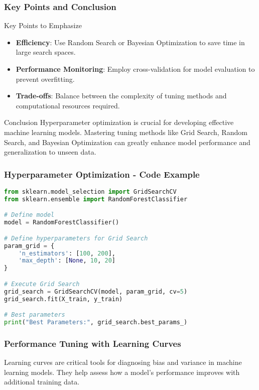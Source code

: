 \documentclass[aspectratio=169]{beamer}
\begin{document}
\begin{frame}[fragile]
    \frametitle{Key Points and Conclusion}
    \begin{block}{Key Points to Emphasize}
        \begin{itemize}
            \item \textbf{Efficiency}: Use Random Search or Bayesian Optimization to save time in large search spaces.
            \item \textbf{Performance Monitoring}: Employ cross-validation for model evaluation to prevent overfitting.
            \item \textbf{Trade-offs}: Balance between the complexity of tuning methods and computational resources required.
        \end{itemize}
    \end{block}

    \begin{block}{Conclusion}
        Hyperparameter optimization is crucial for developing effective machine learning models. Mastering tuning methods like Grid Search, Random Search, and Bayesian Optimization can greatly enhance model performance and generalization to unseen data.
    \end{block}
\end{frame}

\begin{frame}[fragile]
    \frametitle{Hyperparameter Optimization - Code Example}
    \begin{lstlisting}[language=Python, frame=single]
from sklearn.model_selection import GridSearchCV
from sklearn.ensemble import RandomForestClassifier

# Define model
model = RandomForestClassifier()

# Define hyperparameters for Grid Search
param_grid = {
    'n_estimators': [100, 200],
    'max_depth': [None, 10, 20]
}

# Execute Grid Search
grid_search = GridSearchCV(model, param_grid, cv=5)
grid_search.fit(X_train, y_train)

# Best parameters
print("Best Parameters:", grid_search.best_params_)
    \end{lstlisting}
\end{frame}

\begin{frame}
    \frametitle{Performance Tuning with Learning Curves}
    Learning curves are critical tools for diagnosing bias and variance in machine learning models. They help assess how a model's performance improves with additional training data.
\end{frame}
\end{document}
